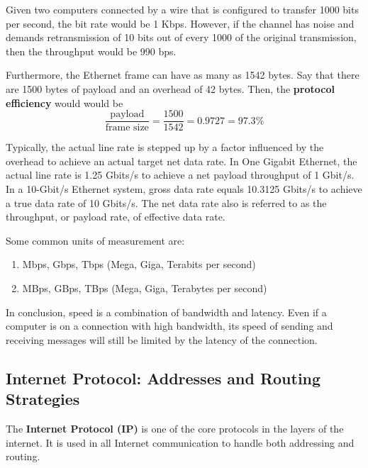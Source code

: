 \documentclass{article}
\newcounter{example}[section]
\begin{document}
  \begin{example}
    \label{ex:protocol-efficiency}
  Given two computers connected by a wire that is configured to transfer 1000 bits per second, the bit rate would be 1 Kbps. However, if the channel has noise and demands retransmission of 10 bits out of every 1000 of the original transmission, then the throughput would be 990 bps. 

  Furthermore, the Ethernet frame can have as many as 1542 bytes. Say that there are 1500 bytes of payload and an overhead of 42 bytes. Then, the \textbf{protocol efficiency} would would be 
  \begin{equation}
    \frac{\text{payload}}{\text{frame size}} = \frac{1500}{1542} = 0.9727 = 97.3\%
  \end{equation}
  \end{example}

  Typically, the actual line rate is stepped up by a factor influenced by the overhead to achieve an actual target net data rate. In One Gigabit Ethernet, the actual line rate is 1.25 Gbits/s to achieve a net payload throughput of 1 Gbit/s. In a 10-Gbit/s Ethernet system, gross data rate equals 10.3125 Gbits/s to achieve a true data rate of 10 Gbits/s. The net data rate also is referred to as the throughput, or payload rate, of effective data rate. 

  Some common units of measurement are: 
  \begin{enumerate}
      \item Mbps, Gbps, Tbps (Mega, Giga, Terabits per second)
      \item MBps, GBps, TBps (Mega, Giga, Terabytes per second)
  \end{enumerate}

  In conclusion, speed is a combination of bandwidth and latency. Even if a computer is on a connection with high bandwidth, its speed of sending and receiving messages will still be limited by the latency of the connection.

  \subsection{Internet Protocol: Addresses and Routing Strategies}
  The \textbf{Internet Protocol (IP)} is one of the core protocols in the layers of the internet. It is used in all Internet communication to handle both addressing and routing. 
\end{document}
